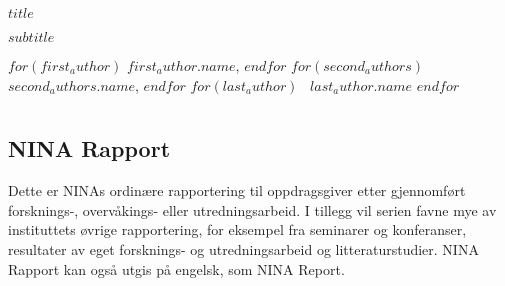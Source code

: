 \documentclass[11pt, a4paper]{article}
\begin{document}


\begin{titlepage}
\thispagestyle{titlefooter}


\huge{$title$} \par\vspace{.3cm}
\LARGE{$subtitle$} \par\vspace{.6cm}
$for(first_author)$
\hspace{0cm}\Large{$first_author.name$},
$endfor$
$for(second_authors)$
\hspace{-2mm}~\Large{$second_authors.name$},
$endfor$
$for(last_author)$
\hspace{-2mm}~\Large{$last_author.name$}
$endfor$

\restoregeometry
\end{titlepage}
\cfoot{}

\section*{}
\hspace{1ex}

\subsection*{\small{NINA Rapport}}
{\normalsize Dette er NINAs ordinære rapportering til oppdragsgiver etter gjennomført forsknings\hyp{}, overvåkings\hyp{} eller utredningsarbeid. I tillegg vil serien favne mye av instituttets øvrige rapportering, for eksempel fra seminarer og konferanser, resultater av eget forsknings\hyp{} og utredningsarbeid og litteraturstudier. NINA Rapport kan også utgis på engelsk, som NINA Report.
}
\end{document}
